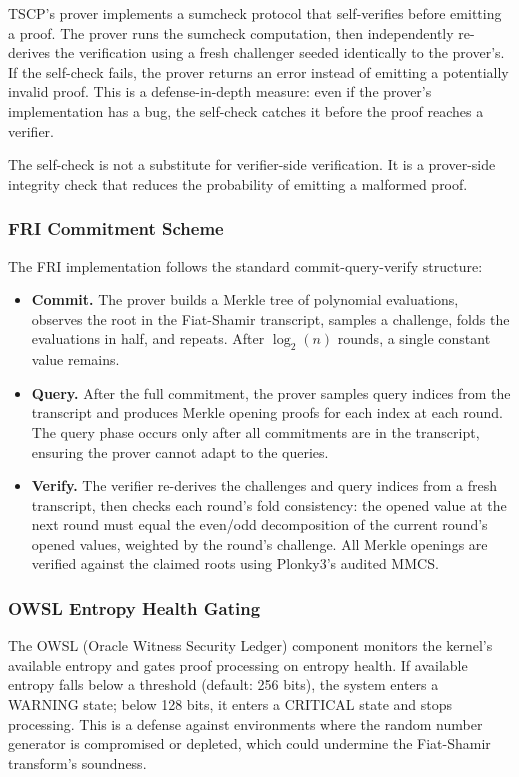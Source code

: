 \documentclass[11pt,a4paper]{article}
\begin{document}
TSCP's prover implements a sumcheck protocol that self-verifies before emitting a proof. The prover runs the sumcheck computation, then independently re-derives the verification using a fresh challenger seeded identically to the prover's. If the self-check fails, the prover returns an error instead of emitting a potentially invalid proof. This is a defense-in-depth measure: even if the prover's implementation has a bug, the self-check catches it before the proof reaches a verifier.

The self-check is not a substitute for verifier-side verification. It is a prover-side integrity check that reduces the probability of emitting a malformed proof.

\subsubsection{FRI Commitment Scheme}

The FRI implementation follows the standard commit-query-verify structure:

\begin{itemize}
\item \textbf{Commit.} The prover builds a Merkle tree of polynomial evaluations, observes the root in the Fiat-Shamir transcript, samples a challenge, folds the evaluations in half, and repeats. After $\log_2(n)$ rounds, a single constant value remains.
\item \textbf{Query.} After the full commitment, the prover samples query indices from the transcript and produces Merkle opening proofs for each index at each round. The query phase occurs only after all commitments are in the transcript, ensuring the prover cannot adapt to the queries.
\item \textbf{Verify.} The verifier re-derives the challenges and query indices from a fresh transcript, then checks each round's fold consistency: the opened value at the next round must equal the even/odd decomposition of the current round's opened values, weighted by the round's challenge. All Merkle openings are verified against the claimed roots using Plonky3's audited MMCS.
\end{itemize}

\subsubsection{OWSL Entropy Health Gating}

The OWSL (Oracle Witness Security Ledger) component monitors the kernel's available entropy and gates proof processing on entropy health. If available entropy falls below a threshold (default: 256 bits), the system enters a WARNING state; below 128 bits, it enters a CRITICAL state and stops processing. This is a defense against environments where the random number generator is compromised or depleted, which could undermine the Fiat-Shamir transform's soundness.
\end{document}
